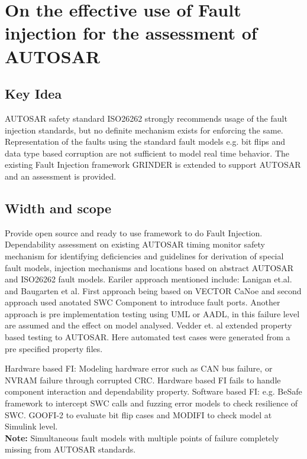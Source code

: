 
\section{On the effective use of Fault injection for the assessment of AUTOSAR} %
\subsection*{Key Idea} %
AUTOSAR safety standard ISO26262 strongly recommends usage of the fault injection standards, but no definite mechanism exists for enforcing the same.
Representation of the faults using the standard fault models e.g. bit flips and data type based corruption are not sufficient to model real time behavior.
The existing Fault Injection framework GRINDER is extended to support AUTOSAR and an assessment is provided.
\subsection*{Width and scope} %
Provide open source and ready to use framework to do Fault Injection. Dependability  assessment on existing AUTOSAR timing monitor safety mechanism for identifying 
deficiencies and guidelines for derivation of special fault models, injection mechanisms and locations based on abstract AUTOSAR and ISO26262 fault models.
Eariler approach mentioned include: Lanigan et.al. and Baugarten et al. First approach being based on VECTOR CaNoe and second approach used anotated SWC Component to 
introduce fault ports. Another approach is pre implementation testing using UML or AADL, in this failure level are assumed and the effect on model analysed.
Vedder et. al extended property based testing to AUTOSAR. Here automated test cases were generated from a pre specified property files.

Hardware based FI: Modeling hardware error such as CAN bus failure, or NVRAM failure through corrupted CRC. Hardware based FI fails to handle component interaction and
dependability property.
Software based FI: e.g. BeSafe framework to intercept SWC calls and fuzzing error models to check resilience of SWC. GOOFI-2 to evaluate bit flip cases and  MODIFI to check model
at Simulink level.\\
\textbf{Note:} Simultaneous fault models with multiple points of failure completely missing from AUTOSAR standards.

